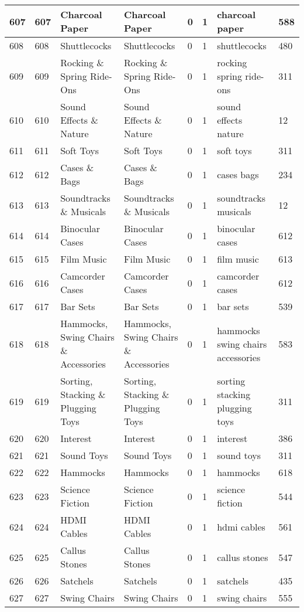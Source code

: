 \begin{longtable}{|l|l|l|l|l|l|l|l|}
607 & 607 & Charcoal Paper & Charcoal Paper & 0 & 1 & charcoal paper & 588 \\ \hline 
608 & 608 & Shuttlecocks & Shuttlecocks & 0 & 1 & shuttlecocks & 480 \\ \hline 
609 & 609 & Rocking \& Spring Ride-Ons & Rocking \& Spring Ride-Ons & 0 & 1 & rocking spring ride-ons & 311 \\ \hline 
610 & 610 & Sound Effects \& Nature & Sound Effects \& Nature & 0 & 1 & sound effects nature & 12 \\ \hline 
611 & 611 & Soft Toys & Soft Toys & 0 & 1 & soft toys & 311 \\ \hline 
612 & 612 & Cases \& Bags & Cases \& Bags & 0 & 1 & cases bags & 234 \\ \hline 
613 & 613 & Soundtracks \& Musicals & Soundtracks \& Musicals & 0 & 1 & soundtracks musicals & 12 \\ \hline 
614 & 614 & Binocular Cases & Binocular Cases & 0 & 1 & binocular cases & 612 \\ \hline 
615 & 615 & Film Music & Film Music & 0 & 1 & film music & 613 \\ \hline 
616 & 616 & Camcorder Cases & Camcorder Cases & 0 & 1 & camcorder cases & 612 \\ \hline 
617 & 617 & Bar Sets & Bar Sets & 0 & 1 & bar sets & 539 \\ \hline 
618 & 618 & Hammocks, Swing Chairs \& Accessories & Hammocks, Swing Chairs \& Accessories & 0 & 1 & hammocks swing chairs accessories & 583 \\ \hline 
619 & 619 & Sorting, Stacking \& Plugging Toys & Sorting, Stacking \& Plugging Toys & 0 & 1 & sorting stacking plugging toys & 311 \\ \hline 
620 & 620 & Interest & Interest & 0 & 1 & interest & 386 \\ \hline 
621 & 621 & Sound Toys & Sound Toys & 0 & 1 & sound toys & 311 \\ \hline 
622 & 622 & Hammocks & Hammocks & 0 & 1 & hammocks & 618 \\ \hline 
623 & 623 & Science Fiction & Science Fiction & 0 & 1 & science fiction & 544 \\ \hline 
624 & 624 & HDMI Cables & HDMI Cables & 0 & 1 & hdmi cables & 561 \\ \hline 
625 & 625 & Callus Stones & Callus Stones & 0 & 1 & callus stones & 547 \\ \hline 
626 & 626 & Satchels & Satchels & 0 & 1 & satchels & 435 \\ \hline 
627 & 627 & Swing Chairs & Swing Chairs & 0 & 1 & swing chairs & 555 \\ \hline 

\end{longtable}
